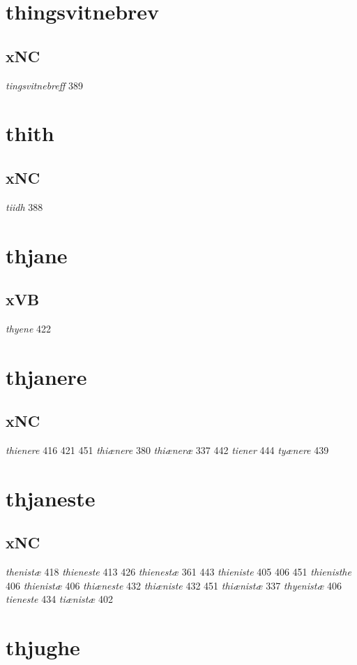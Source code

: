 \documentclass[a4paper,twocolumn]{article}
\begin{document}
\section{thingsvitnebrev}
\label{sec:org51280d0}
\subsection{xNC}
\label{sec:orgfc9c386}
\emph{tingsvitnebreff} 389 
\section{thith}
\label{sec:org37c3db7}
\subsection{xNC}
\label{sec:org0aaccf9}
\emph{tiidh} 388 
\section{thjane}
\label{sec:orgdfcb15c}
\subsection{xVB}
\label{sec:org7f5a753}
\emph{thyene} 422 
\section{thjanere}
\label{sec:orgd10f436}
\subsection{xNC}
\label{sec:org91bf66e}
\emph{thienere} 416 421 451 \emph{thiænere} 380 \emph{thiæneræ} 337 442 \emph{tiener} 444 \emph{tyænere} 439 
\section{thjaneste}
\label{sec:org1fa2978}
\subsection{xNC}
\label{sec:orgf2ef5d4}
\emph{thenistæ} 418 \emph{thieneste} 413 426 \emph{thienestæ} 361 443 \emph{thieniste} 405 406 451 \emph{thienisthe} 406 \emph{thienistæ} 406 \emph{thiæneste} 432 \emph{thiæniste} 432 451 \emph{thiænistæ} 337 \emph{thyenistæ} 406 \emph{tieneste} 434 \emph{tiænistæ} 402 
\section{thjughe}
\label{sec:orge22fb40}
\end{document}

